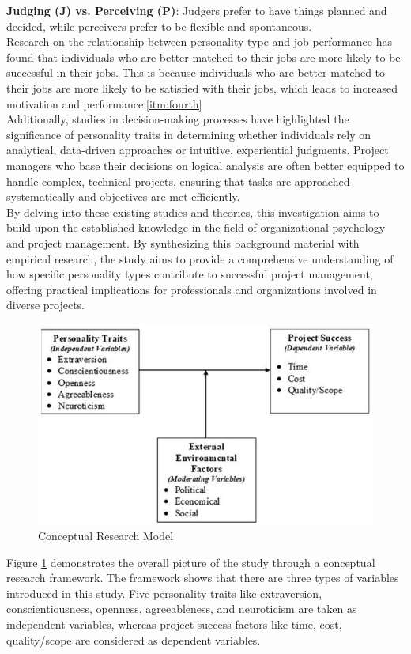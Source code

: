 \documentclass[a4Paper]{article}
\begin{document}
\textbf{Judging (J) vs. Perceiving (P)}: Judgers prefer to have things planned and decided, while perceivers prefer to be flexible and spontaneous.\\

Research on the relationship between personality type and job performance has found that individuals who are better matched to their jobs are more likely to be successful in their jobs. This is because individuals who are better matched to their jobs are more likely to be satisfied with their jobs, which leads to increased motivation and performance.\ref{itm:fourth}\\

Additionally, studies in decision-making processes have highlighted the significance of personality traits in determining whether individuals rely on analytical, data-driven approaches or intuitive, experiential judgments. Project managers who base their decisions on logical analysis are often better equipped to handle complex, technical projects, ensuring that tasks are approached systematically and objectives are met efficiently.\\

By delving into these existing studies and theories, this investigation aims to build upon the established knowledge in the field of organizational psychology and project management. By synthesizing this background material with empirical research, the study aims to provide a comprehensive understanding of how specific personality types contribute to successful project management, offering practical implications for professionals and organizations involved in diverse projects.
\pagebreak

\begin{figure}[h]
\centering
\includegraphics[width=0.65\linewidth]{TAS/media/sustainability-13-09477-g001-550.jpg}
\caption{Conceptual Research Model}
\label{fig:x research model}
\end{figure}

Figure \ref{fig:x research model} demonstrates the overall picture of the study through a conceptual research framework. The framework shows that there are three types of variables introduced in this study. Five personality traits like extraversion, conscientiousness, openness, agreeableness, and neuroticism are taken as independent variables, whereas project success factors like time, cost, quality/scope are considered as dependent variables.\\
\end{document}
